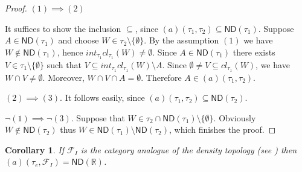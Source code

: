 \documentclass[12pt]{amsart}
\theoremstyle{plain}
\newtheorem{corollary}[theorem]{Corollary}
\theoremstyle{definition}
\theoremstyle{remark}
\newcommand{\cl}{\mathit{cl}}
\newcommand{\real}{\mathbb{R}}
\newcommand{\cF}{{\mathcal F}}
\newcommand{\cK}{{\mathcal K}}
\newcommand{\mathint}{\mathit{int}}
\newcommand{\aideal}{\mathit{(a)}}
\newcommand{\topWithoutEmptyset}[1]{#1\setminus\lbrace\emptyset\rbrace}
\begin{document}
\begin{proof}  
$(1) \implies (2)$

It suffices to show the inclusion $\subseteq$, since
$\aideal(\tau_1, \tau_2) \subseteq \mathsf{ND}(\tau_1)$.
Suppose $A\in \mathsf{ND}(\tau_1)$ and choose
$W \in \tau_2\setminus\lbrace \emptyset \rbrace$.
By the assumption $(1)$ we have $W \not\in \mathsf{ND}(\tau_1)$, 
hence $\mathint_{\tau_1} \cl_{\tau_1} (W) \not= \emptyset$.
Since $A \in \mathsf{ND}(\tau_1)$ there exists 
$V\in \tau_1\setminus\lbrace\emptyset\rbrace$ such 
that $V \subseteq \mathint_{\tau_1} \cl_{\tau_1} (W) \setminus A$. 
Since $\emptyset \not= V \subseteq \cl_{\tau_1} (W)$, 
we have $W \cap V \not= \emptyset$. Moreover,
$W \cap V \cap A = \emptyset$. Therefore 
$A \in \aideal(\tau_1, \tau_2)$.

$(2) \implies (3)$.
It follows easily, since 
$\aideal(\tau_1, \tau_2) \subseteq \mathsf{ND}(\tau_2)$.

$\neg(1)\implies \neg(3)$.
Suppose that $W\in\tau_2\cap\mathsf{ND}(\tau_1) \setminus \lbrace\emptyset\rbrace$.
Obviously $W\not\in\mathsf{ND}(\tau_2)$ thus
$W \in \mathsf{ND}(\tau_1) \setminus \mathsf{ND}(\tau_2)$,
which finishes the proof.
\end{proof}

\begin{corollary}
If $\cF_I$ is the category analogue of the density topology (see \cite{PWBW}) 
then 
$(a)(\tau_e, \cF_I) = \mathsf{ND}(\real)$.
\end{corollary}
\end{document}

